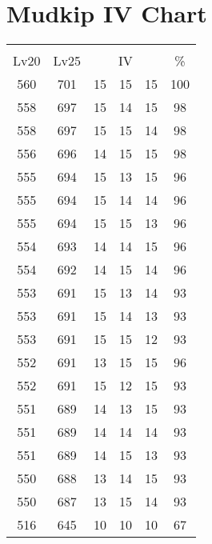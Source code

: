 \documentclass{article}%
\begin{document}
%
\normalsize%
\section{Mudkip IV Chart}%
\label{sec:Mudkip IV Chart}%
\renewcommand{\arraystretch}{1.5}%
\begin{tabular}{|c|c|c|c|c|c|}%
\hline%
\multicolumn{6}{|c|}{\textcolor{white}{ 
\linebreak{Mudkip}
}%
\cellcolor{black}}\\%
\multicolumn{1}{|c}{Lv20}&\multicolumn{1}{c|}{Lv25}&\multicolumn{3}{c|}{IV}&\multicolumn{1}{|c|}{\%}\\%
\hline%
\rowcolor{color100}%
560&701&15&15&15&100\\%
\hline%
\rowcolor{color98}%
558&697&15&14&15&98\\%
\hline%
\rowcolor{color98}%
558&697&15&15&14&98\\%
\hline%
\rowcolor{color98}%
556&696&14&15&15&98\\%
\hline%
\rowcolor{color96}%
555&694&15&13&15&96\\%
\hline%
\rowcolor{color96}%
555&694&15&14&14&96\\%
\hline%
\rowcolor{color96}%
555&694&15&15&13&96\\%
\hline%
\rowcolor{color96}%
554&693&14&14&15&96\\%
\hline%
\rowcolor{color96}%
554&692&14&15&14&96\\%
\hline%
\rowcolor{color93}%
553&691&15&13&14&93\\%
\hline%
\rowcolor{color93}%
553&691&15&14&13&93\\%
\hline%
\rowcolor{color93}%
553&691&15&15&12&93\\%
\hline%
\rowcolor{color96}%
552&691&13&15&15&96\\%
\hline%
\rowcolor{color93}%
552&691&15&12&15&93\\%
\hline%
\rowcolor{color93}%
551&689&14&13&15&93\\%
\hline%
\rowcolor{color93}%
551&689&14&14&14&93\\%
\hline%
\rowcolor{color93}%
551&689&14&15&13&93\\%
\hline%
\rowcolor{color93}%
550&688&13&14&15&93\\%
\hline%
\rowcolor{color93}%
550&687&13&15&14&93\\%
\hline%
\rowcolor{color91}%
516&645&10&10&10&67\\%
\end{tabular}

%
\end{document}
